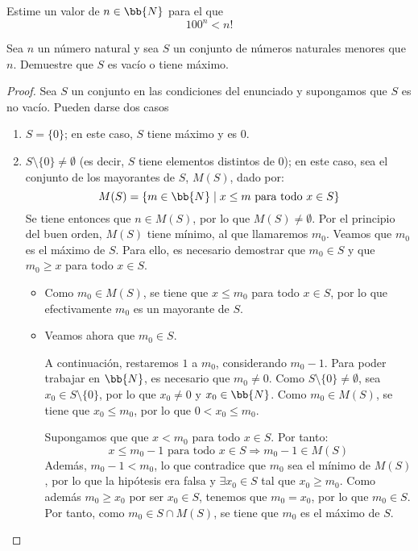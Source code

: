 \begin{ejercicio}
    Estime un valor de $n\in \bb{N}$ para el que
    $$100^n < n!$$

\end{ejercicio}

\begin{ejercicio}
Sea $n$ un número natural y sea $S$ un conjunto de números naturales menores que $n$. Demuestre que $S$ es vacío o tiene máximo.
\begin{proof}
Sea $S$ un conjunto en las condiciones del enunciado y supongamos que $S$ es no vacío. Pueden darse dos casos
\begin{enumerate}
    \item $S = \{0\}$; en este caso, $S$ tiene máximo y es $0$.
    \item $S\setminus\{0\} \neq \emptyset$ (es decir, $S$ tiene elementos distintos de $0$); en este caso, sea el conjunto de los mayorantes de $S$, $M(S)$, dado por:
    \begin{equation*}
        M(S) = \{ m \in \bb{N} \mid x \leq m \text{ para todo } x \in S\}
    \end{equation*}
    Se tiene entonces que $n\in M(S)$, por lo que $M(S)\neq \emptyset$. Por el principio del buen orden, $M(S)$ tiene mínimo, al que llamaremos $m_0$.
    Veamos que $m_0$ es el máximo de $S$. Para ello, es necesario demostrar que $m_0\in S$ y que $m_0\geq x$ para todo $x\in S$.
    \begin{itemize}
        \item Como $m_0\in M(S)$, se tiene que $x\leq m_0$ para todo $x\in S$, por lo que efectivamente $m_0$ es un mayorante de $S$.
        \item Veamos ahora que $m_0\in S$.
        \begin{observacion}
            A continuación, restaremos $1$ a $m_0$, considerando $m_0-1$.
            Para poder trabajar en $\bb{N}$, es necesario que $m_0\neq 0$.
            Como $S\setminus \{0\}\neq \emptyset$, sea $x_0\in S\setminus \{0\}$, por lo que $x_0\neq 0$ y $x_0\in \bb{N}$.
            Como $m_0\in M(S)$, se tiene que $x_0\leq m_0$, por lo que $0<x_0\leq m_0$.
        \end{observacion}
        
        
        Supongamos que que $x<m_0$ para todo $x\in S$.
        Por tanto:
        \begin{equation*}
            x\leq m_0 - 1 \text{ para todo } x\in S \Longrightarrow m_0 - 1 \in M(S)
        \end{equation*}
        Además, $m_0 - 1 < m_0$, lo que contradice que $m_0$ sea el mínimo de $M(S)$, por lo que la hipótesis era falsa y $\exists x_0\in S$ tal que $x_0\geq m_0$.
        Como además $m_0\geq x_0$ por ser $x_0\in S$, tenemos que $m_0 = x_0$, por lo que $m_0\in S$.
        Por tanto, como $m_0\in S\cap M(S)$, se tiene que $m_0$ es el máximo de $S$.\qedhere
    \end{itemize}
\end{enumerate}
\end{proof}
\end{ejercicio}

